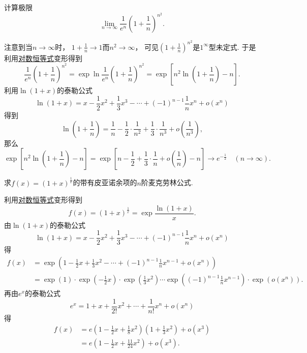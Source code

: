 \begin{example}
计算极限\[
	\lim_{n\to\infty} \frac{1}{e^n} \left(1+\frac{1}{n}\right)^{n^2}.
\]
\begin{solution}
注意到当\(n\to\infty\)时，
\(1+\frac1n\to1\)而\(n^2\to\infty\)，
可见\(\left(1+\frac{1}{n}\right)^{n^2}\)是\(1^\infty\)型未定式.
于是利用\hyperref[equation:函数.对数恒等式]{对数恒等式}变形得到\[
	\frac{1}{e^n} \left(1+\frac{1}{n}\right)^{n^2}
	= \exp\ln\frac{1}{e^n} \left(1+\frac{1}{n}\right)^{n^2}
	= \exp[ n^2 \ln(1+\frac{1}{n}) - n ].
\]
利用\(\ln(1+x)\)的泰勒公式\[
	\ln(1+x)
	= x - \frac{1}{2} x^2 + \frac{1}{3} x^3 - \dotsb
		+ (-1)^{n-1} \frac{1}{n} x^n + o(x^n)
\]得到\[
	\ln(1+\frac1n)
	= \frac1n - \frac12\cdot\frac1{n^2} + \frac13\cdot\frac1{n^3}
	+ o\left( \frac1{n^3} \right),
\]
那么\[
	\exp[ n^2 \ln(1+\frac{1}{n}) - n ]
	= \exp[
		n - \frac12 + \frac13\cdot\frac1n + o\left( \frac1n \right)
		- n
	]
	\to e^{-\frac12}
	\quad(n\to\infty).
\]
\end{solution}
\end{example}
\begin{example}
求\(f(x) = (1+x)^{\frac1x}\)的带有皮亚诺余项的\(n\)阶麦克劳林公式.
\begin{solution}
利用\hyperref[equation:函数.对数恒等式]{对数恒等式}变形得到\[
	f(x) = (1+x)^{\frac1x}
	= \exp\frac{\ln(1+x)}x.
\]
由\(\ln(1+x)\)的泰勒公式\[
	\ln(1+x)
	= x - \frac12 x^2 + \frac13 x^3 - \dotsb
		+ (-1)^{n-1} \frac1n x^n + o(x^n)
\]得\begin{align*}
	f(x) &= \exp\left(
		1 - \frac12 x + \frac13 x^2 - \dotsb
		+ (-1)^{n-1} \frac1n x^{n-1} + o(x^n)
	\right) \\
	&= \exp(1) \cdot \exp(-\frac12 x) \cdot \exp(\frac13 x^2)
	\dotsm \exp((-1)^{n-1} \frac1n x^{n-1}) \cdot \exp(o(x^n)).
\end{align*}
再由\(e^x\)的泰勒公式\[
	e^x = 1 + x + \frac1{2!} x^2 + \dotsb
	+ \frac1{n!} x^n + o(x^n)
\]得\begin{align*}
	f(x) &= e \left( 1 - \frac12 x + \frac18 x^2 \right)
	\left( 1 + \frac13 x^2 \right) + o(x^3) \\
	&= e \left( 1 - \frac12 x + \frac{11}{24} x^2 \right) + o(x^3).
\end{align*}
\end{solution}
\end{example}


